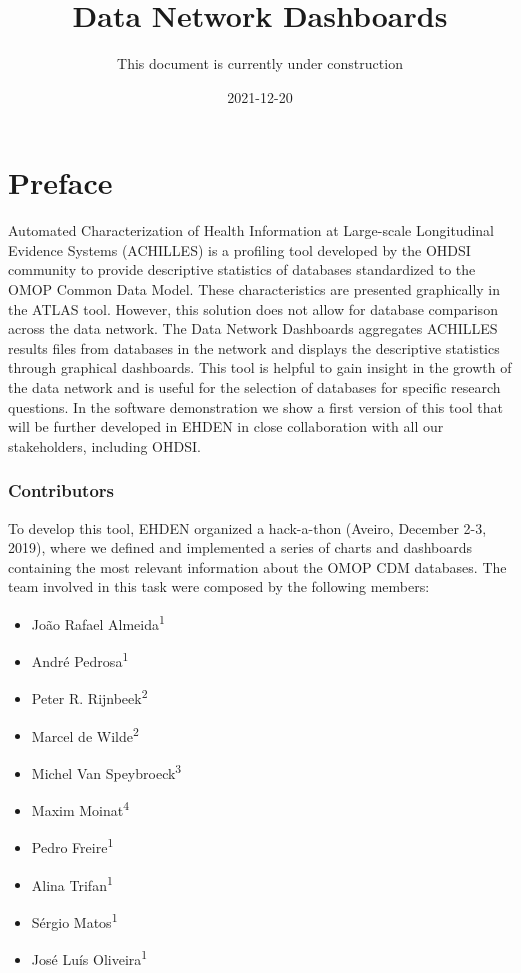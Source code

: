 \documentclass[
]{book}
\title{Data Network Dashboards}
\author{This document is currently under construction}
\date{2021-12-20}
\providecommand{\tightlist}{%
  \setlength{\itemsep}{0pt}\setlength{\parskip}{0pt}}
\begin{document}
\maketitle

{
\setcounter{tocdepth}{1}
\tableofcontents
}
\hypertarget{preface}{%
\chapter{Preface}\label{preface}}

Automated Characterization of Health Information at Large-scale Longitudinal Evidence Systems (ACHILLES) is a profiling tool developed by the OHDSI community to provide descriptive statistics of databases standardized to the OMOP Common Data Model. These characteristics are presented graphically in the ATLAS tool. However, this solution does not allow for database comparison across the data network. The Data Network Dashboards aggregates ACHILLES results files from databases in the network and displays the descriptive statistics through graphical dashboards. This tool is helpful to gain insight in the growth of the data network and is useful for the selection of databases for specific research questions. In the software demonstration we show a first version of this tool that will be further developed in EHDEN in close collaboration with all our stakeholders, including OHDSI.

\hypertarget{contributors}{%
\subsection*{Contributors}\label{contributors}}

To develop this tool, EHDEN organized a hack-a-thon (Aveiro, December 2-3, 2019), where we defined and implemented a series of charts and dashboards containing the most relevant information about the OMOP CDM databases. The team involved in this task were composed by the following members:

\begin{itemize}
\tightlist
\item
  João Rafael Almeida\textsuperscript{1}
\item
  André Pedrosa\textsuperscript{1}
\item
  Peter R. Rijnbeek\textsuperscript{2}
\item
  Marcel de Wilde\textsuperscript{2}
\item
  Michel Van Speybroeck\textsuperscript{3}
\item
  Maxim Moinat\textsuperscript{4}
\item
  Pedro Freire\textsuperscript{1}
\item
  Alina Trifan\textsuperscript{1}
\item
  Sérgio Matos\textsuperscript{1}
\item
  José Luís Oliveira\textsuperscript{1}
\end{itemize}
\end{document}
